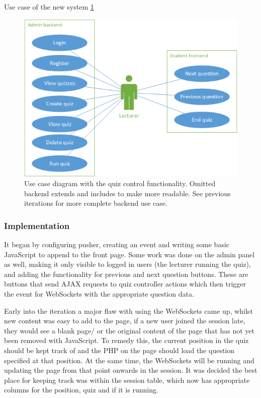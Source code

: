 Use case of the new system \ref{fig:iter-4-use-case}
\begin{figure}
	\caption{Use case diagram with the quiz control functionality. Omitted backend extends and includes to make more readable. See previous iterations for more complete backend use case.}
	\centerline{\includegraphics{Chapter2/Iter-4/iter-4-use-case}}
	\label{fig:iter-4-use-case}
\end{figure}


\subsubsection{Implementation}
It began by configuring pusher, creating an event and writing some basic JavaScript to append to the front page. Some work was done on the admin panel as well, making it only visible to logged in users (the lecturer running the quiz), and adding the functionality for previous and next question buttons. These are buttons that send AJAX requests to quiz controller actions which then trigger the event for WebSockets with the appropriate question data.

Early into the iteration a major flaw with using the WebSockets came up, whilst new content was easy to add to the page, if a new user joined the session late, they would see a blank page/ or the original content of the page that has not yet been removed with JavaScript. To remedy this, the current position in the quiz should be kept track of and the PHP on the page should load the question specified at that position. At the same time, the WebSockets will be running and updating the page from that point onwards in the session. It was decided the best place for keeping track was within the session table, which now has appropriate columns for the position, quiz and if it is running.

